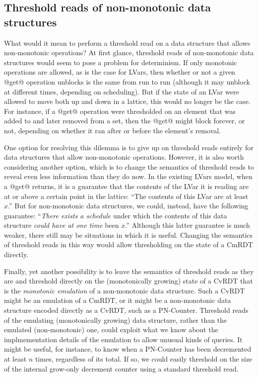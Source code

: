 \documentclass{article}
\begin{document}
\subsection{Threshold reads of non-monotonic data structures}

What would it mean to perform a threshold read on a data structure
that allows non-monotonic operations?  At first glance, threshold
reads of non-monotonic data structures would seem to pose a problem
for determinism. If only monotonic operations are allowed, as is the
case for LVars, then whether or not a given @get@ operation unblocks
is the same from run to run (although it may unblock at different
times, depending on scheduling).  But if the state of an LVar were
allowed to move both up and down in a lattice, this would no longer be
the case. For instance, if a @get@ operation were thresholded on an
element that was added to and later removed from a set, then the @get@
might block forever, or not, depending on whether it ran after or
before the element's removal.

One option for resolving this dilemma is to give up on threshold reads
entirely for data structures that allow non-monotonic operations.
However, it is also worth considering another option, which is to
change the semantics of threshold reads to reveal even less
information than they do now.  In the existing LVars model, when a
@get@ returns, it is a guarantee that the contents of the LVar it is
reading are at or above a certain point in the lattice: ``The contents
of this LVar are at least $x$.''  But for non-monotonic data
structures, we could, instead, have the following guarantee:
``\emph{There exists a schedule} under which the contents of this data
structure \emph{could have at one time} been $x$.''  Although this
latter guarantee is much weaker, there still may be situations in
which it is useful.  Changing the semantics of threshold reads in this
way would allow thresholding on the state of a CmRDT directly.

Finally, yet another possibility is to leave the semantics of
threshold reads as they are and threshold directly on the
(monotonically growing) state of a CvRDT that is the \emph{monotonic
  emulation} of a non-monotonic data structure.  Such a CvRDT might be
an emulation of a CmRDT, or it might be a non-monotonic data structure
encoded directly as a CvRDT, such as a PN-Counter.  Threshold reads of
the emulating (monotonically growing) data structure, rather than the
emulated (non-monotonic) one, could exploit what we know about the
implmementation details of the emulation to allow unusual kinds of
queries.  It might be useful, for instance, to know when a PN-Counter
has been decremented at least $n$ times, regardless of its total.  If
so, we could easily threshold on the size of the internal grow-only
decrement counter using a standard threshold read.
\end{document}
